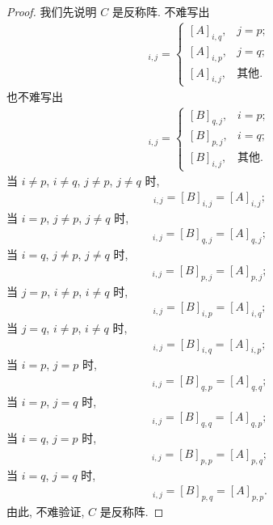 \begin{proof}
    我们先说明 \(C\) 是反称阵.
    不难写出
    \begin{align*}
        [B]_{i,j} =
        \begin{cases}
            [A]_{i,q}, & j = p;     \\
            [A]_{i,p}, & j = q;     \\
            [A]_{i,j}, & \text{其他}.
        \end{cases}
    \end{align*}
    也不难写出
    \begin{align*}
        [C]_{i,j} =
        \begin{cases}
            [B]_{q,j}, & i = p;     \\
            [B]_{p,j}, & i = q;     \\
            [B]_{i,j}, & \text{其他}.
        \end{cases}
    \end{align*}
    当 \(i \neq p\), \(i \neq q\),
    \(j \neq p\), \(j \neq q\) 时,
    \begin{align*}
        [C]_{i,j} = [B]_{i,j} = [A]_{i,j};
    \end{align*}
    当 \(i = p\), \(j \neq p\), \(j \neq q\) 时,
    \begin{align*}
        [C]_{i,j} = [B]_{q,j} = [A]_{q,j};
    \end{align*}
    当 \(i = q\), \(j \neq p\), \(j \neq q\) 时,
    \begin{align*}
        [C]_{i,j} = [B]_{p,j} = [A]_{p,j};
    \end{align*}
    当 \(j = p\), \(i \neq p\), \(i \neq q\) 时,
    \begin{align*}
        [C]_{i,j} = [B]_{i,p} = [A]_{i,q};
    \end{align*}
    当 \(j = q\), \(i \neq p\), \(i \neq q\) 时,
    \begin{align*}
        [C]_{i,j} = [B]_{i,q} = [A]_{i,p};
    \end{align*}
    当 \(i = p\), \(j = p\) 时,
    \begin{align*}
        [C]_{i,j} = [B]_{q,p} = [A]_{q,q};
    \end{align*}
    当 \(i = p\), \(j = q\) 时,
    \begin{align*}
        [C]_{i,j} = [B]_{q,q} = [A]_{q,p};
    \end{align*}
    当 \(i = q\), \(j = p\) 时,
    \begin{align*}
        [C]_{i,j} = [B]_{p,p} = [A]_{p,q};
    \end{align*}
    当 \(i = q\), \(j = q\) 时,
    \begin{align*}
        [C]_{i,j} = [B]_{p,q} = [A]_{p,p}.
    \end{align*}
    由此, 不难验证, \(C\) 是反称阵.


\end{proof}
